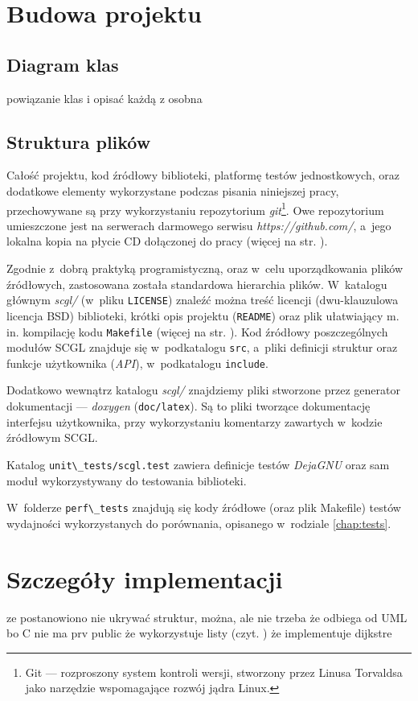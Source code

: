 \documentclass[a4paper,12pt,polish,oneside]{thesis}
\newcommand\code[1]{\lstinline[style=line]{#1}}
\begin{document}
\section{Budowa projektu}
\subsection{Diagram klas}
powiązanie klas i opisać każdą z osobna
\subsection{Struktura plików}
Całość projektu, kod źródłowy biblioteki, platformę testów jednostkowych, oraz dodatkowe elementy wykorzystane podczas pisania niniejszej pracy, przechowywane są przy wykorzystaniu repozytorium \emph{git}\footnote{Git --- rozproszony system kontroli wersji, stworzony przez Linusa Torvaldsa jako narzędzie wspomagające rozwój jądra Linux.}.
Owe repozytorium umieszczone jest na serwerach darmowego serwisu \emph{https://github.com/}, a~jego lokalna kopia na płycie CD dołączonej do pracy (więcej na str. \pageref{chap:cd}).

Zgodnie z~dobrą praktyką programistyczną, oraz w~celu uporządkowania plików źródłowych, zastosowana została standardowa hierarchia plików.
W~katalogu głównym \emph{scgl/} (w~pliku \code{LICENSE}) znaleźć można treść licencji (dwu-klauzulowa licencja BSD) biblioteki, krótki opis projektu (\code{README}) oraz plik ułatwiający m. in. kompilację kodu \code{Makefile} (więcej na str. \pageref{chap:make}).
Kod źródłowy poszczególnych modułów SCGL znajduje się w~podkatalogu \code{src}, a~pliki definicji struktur oraz funkcje użytkownika (\emph{API}), w~podkatalogu \code{include}.

Dodatkowo wewnątrz katalogu \emph{scgl/} znajdziemy pliki stworzone przez generator dokumentacji ---  \emph{doxygen} (\code{doc/latex}).
Są to pliki tworzące dokumentację interfejsu użytkownika, przy wykorzystaniu komentarzy zawartych w~kodzie źródłowym SCGL.

Katalog \code{unit\_tests/scgl.test} zawiera definicje testów \emph{DejaGNU} oraz sam moduł wykorzystywany do testowania biblioteki.

W~folderze \code{perf\_tests} znajdują się kody źródłowe (oraz plik Makefile) testów wydajności wykorzystanych do porównania, opisanego w~rodziale \ref{chap:tests}.

\section{Szczegóły implementacji}
ze postanowiono nie ukrywać struktur, można, ale nie trzeba
że odbiega od UML bo C nie ma prv public
że wykorzystuje listy (czyt. )
że implementuje dijkstre
\end{document}
